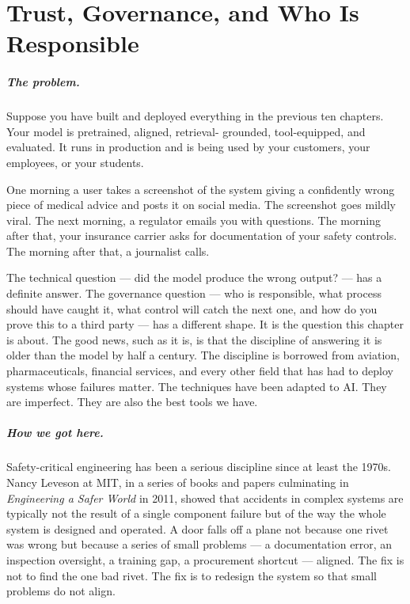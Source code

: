 
\chapter{Trust, Governance, and Who Is Responsible}
\label{chap:governance}
\label{ntg:ch11}

\scenelabel
\begin{scenestrip}
\end{scenestrip}

\paragraph{The problem.} Suppose you have built and deployed everything in the previous
ten chapters. Your model is pretrained, aligned, retrieval-
grounded, tool-equipped, and evaluated. It runs in production
and is being used by your customers, your employees, or your
students.

One morning a user takes a screenshot of the system giving a
confidently wrong piece of medical advice and posts it on
social media. The screenshot goes mildly viral. The next
morning, a regulator emails you with questions. The morning
after that, your insurance carrier asks for documentation of
your safety controls. The morning after that, a journalist
calls.

The technical question --- did the model produce the wrong
output? --- has a definite answer. The governance question ---
who is responsible, what process should have caught it, what
control will catch the next one, and how do you prove this to
a third party --- has a different shape. It is the question
this chapter is about. The good news, such as it is, is that
the discipline of answering it is older than the model by
half a century. The discipline is borrowed from aviation,
pharmaceuticals, financial services, and every other field
that has had to deploy systems whose failures matter. The
techniques have been adapted to AI. They are imperfect. They
are also the best tools we have.

\paragraph{How we got here.} Safety-critical engineering has been a serious discipline
since at least the 1970s. Nancy Leveson at MIT, in a series
of books and papers culminating in \emph{Engineering a Safer
World} in 2011, showed that accidents in complex systems are
typically not the result of a single component failure but of
the way the whole system is designed and operated. A door
falls off a plane not because one rivet was wrong but because
a series of small problems --- a documentation error, an
inspection oversight, a training gap, a procurement
shortcut --- aligned. The fix is not to find the one bad
rivet. The fix is to redesign the system so that small
problems do not align.

